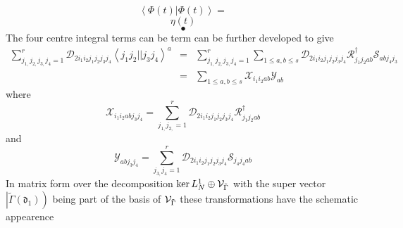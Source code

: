 \documentclass[aps,preprint]{revtex4}
\begin{document}
\begin{equation}
\left\langle \Phi \left( t\right) |\Phi \left( t\right) \right\rangle =
\end{equation}%
\begin{equation}
\eta \left( t\right)
\end{equation}%
\begin{equation}
\bullet
\end{equation}%
The four centre integral terms can be term can be further developed to give 
\begin{eqnarray}
\sum_{j_{1,}j_{2,}j_{3,}j_{4}=1}^{r}\mathcal{D}%
_{2i_{1}i_{2}j_{1}j_{2}j_{3}j_{4}}\left\langle
j_{1}j_{2}||j_{3}j_{4}\right\rangle ^{a}
&=&\sum_{j_{1,}j_{2,}j_{3,}j_{4}=1}^{r}\sum_{1\leq a,b\leq s}\mathcal{D}%
_{2i_{1}i_{2}j_{1}j_{2}j_{3}j_{4}}\mathcal{R}_{j_{1}j_{2}ab}^{\dagger }%
\mathcal{S}_{abj_{4}j_{3}} \\
&=&\sum_{1\leq a,b\leq s}\mathcal{X}_{i_{1}i_{2}ab}\mathcal{Y}_{ab}
\end{eqnarray}%
where 
\begin{equation}
\mathcal{X}_{i_{1}i_{2}abj_{3}j_{4}}=\sum_{j_{1,}j_{2,}=1}^{r}\mathcal{D}%
_{2i_{1}i_{2}j_{1}j_{2}j_{3}j_{4}}\mathcal{R}_{j_{1}j_{2}ab}^{\dagger }
\end{equation}%
and 
\begin{equation}
\mathcal{Y}_{abj_{3}j_{4}}=\sum_{j_{3,}j_{4}=1}^{r}\mathcal{D}%
_{2i_{1}i_{2}j_{1}j_{2}j_{3}j_{4}}\mathcal{S}_{j_{4}j_{4}ab}
\end{equation}%
In matrix form over the decomposition $\ker L_{N}^{1}\oplus \mathcal{V}_{%
\tilde{\Gamma}}$ with the super vector $\left\vert \tilde{\Gamma}\left( 
\mathfrak{d}_{1}\right) \right) $ being part of the basis of $\mathcal{V}_{%
\tilde{\Gamma}}$ these transformations have the schematic appearence%
\end{document}
